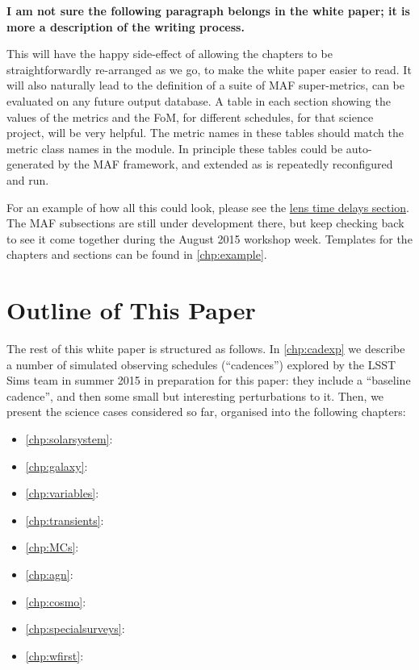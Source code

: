 {\bf I am not sure the following paragraph belongs in the white paper;
  it is more a description of the writing process.}

This will have the happy side-effect of allowing the chapters to be
straightforwardly re-arranged as we go, to make the white paper easier
to read. It will also naturally lead to the definition of a suite of
MAF  super-metrics, can be evaluated on any future \OpSim output
database.  A table in each section showing the values of the metrics
and the FoM, for different schedules, for that science project, will
be very helpful. The metric names in these tables should match the
metric class names in the
\href{https://github.com/LSST-nonproject/sims_maf_contrib/wiki}{\simsMafContrib}
module. In principle these tables could be auto-generated by the MAF
framework, and extended as \OpSim is repeatedly reconfigured and run.

For an example of how all this could look, please see the
\hyperref[sec:lenstimedelays]{lens
time delays section}. The MAF subsections are still under development
there, but keep checking back to see it come together during the
August 2015 workshop week. Templates for the chapters and sections can
be found in \autoref{chp:example}.



\section{Outline of This Paper}
\def\secname{intro:outline}\label{sec:\secname}

The rest of this white paper is structured as follows. In
\autoref{chp:cadexp} we describe a number of \OpSim simulated observing
schedules (``cadences'') explored by the LSST Sims team in summer 2015
in preparation for this paper: they include a ``baseline cadence'', and
then some small but interesting perturbations to it. Then, we present
the science cases considered so far, organised into the following
chapters:

\begin{itemize}
    \item \autoref{chp:solarsystem}: 
    \item \autoref{chp:galaxy}: 
    \item \autoref{chp:variables}: 
    \item \autoref{chp:transients}: 
    \item \autoref{chp:MCs}: 
    \item \autoref{chp:agn}: 
    \item \autoref{chp:cosmo}: 
    \item \autoref{chp:specialsurveys}: 
    \item \autoref{chp:wfirst}: 
\end{itemize}


